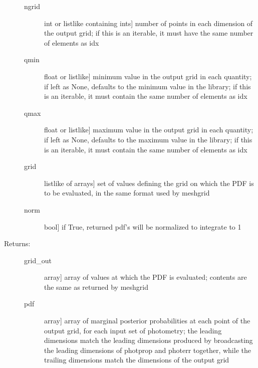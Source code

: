 \documentclass[letterpaper,10pt,english]{sphinxmanual}
\begin{document}
\begin{fulllineitems}
\begin{fulllineitems}
\begin{description}
\begin{description}
\item[{ngrid}] \leavevmode{[}int or listlike containing ints{]}
number of points in each dimension of the output grid;
if this is an iterable, it must have the same number of
elements as idx

\item[{qmin}] \leavevmode{[}float or listlike{]}
minimum value in the output grid in each quantity; if
left as None, defaults to the minimum value in the
library; if this is an iterable, it must contain the
same number of elements as idx

\item[{qmax}] \leavevmode{[}float or listlike{]}
maximum value in the output grid in each quantity; if
left as None, defaults to the maximum value in the
library; if this is an iterable, it must contain the
same number of elements as idx

\item[{grid}] \leavevmode{[}listlike of arrays{]}
set of values defining the grid on which the PDF is to
be evaluated, in the same format used by meshgrid

\item[{norm}] \leavevmode{[}bool{]}
if True, returned pdf’s will be normalized to integrate
to 1

\end{description}

\item[{Returns:}] \leavevmode\begin{description}
\item[{grid\_out}] \leavevmode{[}array{]}
array of values at which the PDF is evaluated; contents
are the same as returned by meshgrid

\item[{pdf}] \leavevmode{[}array{]}
array of marginal posterior probabilities at each point
of the output grid, for each input set of photometry; the leading
dimensions match the leading dimensions produced by
broadcasting the leading dimensions of photprop and
photerr together, while the trailing dimensions match
the dimensions of the output grid

\end{description}

\end{description}

\end{fulllineitems}



\end{fulllineitems}
\end{document}
